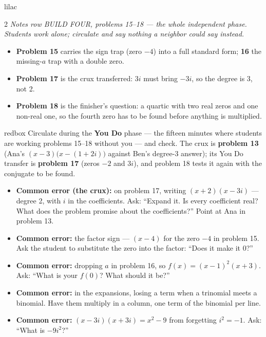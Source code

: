 \documentclass[10pt]{article}
\begin{document}
\begin{skillbox}{lilac}
\begin{multicols}{2}
\textit{Notes row BUILD FOUR, problems 15--18 --- the whole independent phase. Students work
alone; circulate and say nothing a neighbor could say instead.}
\begin{itemize}
  \item \textbf{Problem 15} carries the sign trap (zero $-4$) into a full standard form;
        \textbf{16} the missing-$a$ trap with a double zero.
  \item \textbf{Problem 17} is the crux transferred: $3i$ must bring $-3i$, so the degree is 3,
        not 2.
  \item \textbf{Problem 18} is the finisher's question: a quartic with two real zeros and one
        non-real one, so the fourth zero has to be found before anything is multiplied.
\end{itemize}
\end{multicols}
\end{skillbox}

\begin{skillbox}{redbox}
Circulate during the \textbf{You Do} phase --- the fifteen minutes where students are working
problems 15--18 without you --- and check. The crux is \textbf{problem 13} (Ana's
$(x - 3)\bigl(x - (1 + 2i)\bigr)$ against Ben's degree-3 answer); its You Do transfer is
\textbf{problem 17} (zeros $-2$ and $3i$), and problem 18 tests it again with the conjugate
to be found.
\begin{itemize}
  \item \textbf{Common error (the crux):} on problem 17, writing $(x + 2)(x - 3i)$ --- degree 2,
        with $i$ in the coefficients. Ask: ``Expand it. Is every coefficient real? What does
        the problem promise about the coefficients?'' Point at Ana in problem 13.
  \item \textbf{Common error:} the factor sign --- $(x - 4)$ for the zero $-4$ in problem 15.
        Ask the student to substitute the zero into the factor: ``Does it make it 0?''
  \item \textbf{Common error:} dropping $a$ in problem 16, so $f(x) = (x - 1)^2(x + 3)$. Ask:
        ``What is your $f(0)$? What should it be?''
  \item \textbf{Common error:} in the expansions, losing a term when a trinomial meets a
        binomial. Have them multiply in a column, one term of the binomial per line.
  \item \textbf{Common error:} $(x - 3i)(x + 3i) = x^2 - 9$ from forgetting $i^2 = -1$. Ask:
        ``What is $-9i^2$?''
\end{itemize}
\end{skillbox}
\end{document}
